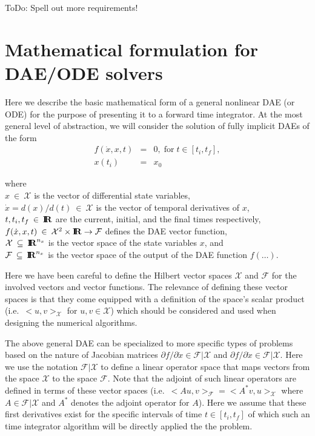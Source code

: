 \documentclass[pdf,ps2pdf,11pt]{SANDreport}
\begin{document}
ToDo: Spell out more requirements!

\section{Mathematical formulation for DAE/ODE solvers}
\label{rythmos:scn:mathformulation}

Here we describe the basic mathematical form of a general nonlinear DAE (or
ODE) for the purpose of presenting it to a forward time integrator.  At the
most general level of abstraction, we will consider the solution of fully
implicit DAEs of the form
%
\begin{eqnarray}
f(\dot{x},x,t) & = & 0, \; \mbox{for} \; t \in [t_i, t_f], \label{rythmos:eqn:dae} \\
x(t_i) & = & x_0 \label{rythmos:eqn:dae:ic}
\end{eqnarray}
\begin{tabbing}
\hspace{4ex}where\hspace{5ex}\= \\
\>	$x\:\in\:\mathcal{X}$ is the vector of differential state variables, \\
\>	$\dot{x} = d(x)/d(t)\:\in\:\mathcal{X}$ is the vector of temporal derivatives of $x$, \\
\>	$t, t_i, t_f\:\in\:\mbox{\textbf{I}}\hspace{-0.6ex}\mbox{\textbf{R}}$ are the current, initial, and the final times respectively, \\
\>	$f(\dot{x},x,t)\:\in\:\mathcal{X}^2\times\mbox{\textbf{I}}\hspace{-0.6ex}\mbox{\textbf{R}}\rightarrow\mathcal{F}$ defines the DAE vector function, \\
\>	$\mathcal{X} \:\subseteq\:\mbox{\textbf{I}}\hspace{-0.6ex}\mbox{\textbf{R}}^{n_x}$ is the vector space of the state variables $x$, and \\
\>	$\mathcal{F} \:\subseteq\:\mbox{\textbf{I}}\hspace{-0.6ex}\mbox{\textbf{R}}^{n_x}$ is the vector space of the output of the DAE function $f(\ldots)$.
\end{tabbing}

Here we have been careful to define the Hilbert vector spaces $\mathcal{X}$
and $\mathcal{F}$ for the involved vectors and vector functions.  The
relevance of defining these vector spaces is that they come equipped with a
definition of the space's scalar product (i.e.\ $<u,v>_{\mathcal{X}}$ for
$u,v\in\mathcal{X}$) which should be considered and used when designing the
numerical algorithms.

The above general DAE can be specialized to more specific types of problems
based on the nature of Jacobian matrices ${}\partial f / {}\partial
{}\dot{x}\in\mathcal{F}|\mathcal{X}$ and ${}\partial f / {}\partial
{}\dot{x}\in\mathcal{F}|\mathcal{X}$.  Here we use the notation
$\mathcal{F}|\mathcal{X}$ to define a linear operator space that maps vectors
from the space $\mathcal{X}$ to the space $\mathcal{F}$.  Note that the
adjoint of such linear operators are defined in terms of these vector spaces
(i.e.\ $<A u,v>_{\mathcal{F}} = <A^* v,u>_{\mathcal{X}}$ where
$A\in\mathcal{F}|\mathcal{X}$ and $A^*$ denotes the adjoint operator for $A$).
Here we assume that these first derivatives exist for the specific intervals
of time $t\in[t_i,t_f]$ of which such an time integrator algorithm will be
directly applied the the problem.
\end{document}
